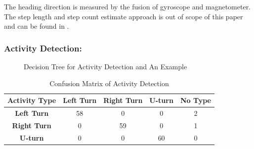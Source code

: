 \documentclass{llncs}
\begin{document}

The heading direction is measured by the fusion of gyroscope and magnetometer. The step length and step count estimate approach is out of scope of this paper and can be found in \cite{wang2012no}. 

\subsubsection{Activity Detection:}

\begin{figure}[!ht]
	\centering
	\vfil
	\caption{Decision Tree for Activity Detection and An Example}
\end{figure}

\begin{table}
	\label{table_conf}
	\caption{Confusion Matrix of Activity Detection}
	\begin{center}
		\begin{tabular}{| c || c | c | c | c |}
			\hline
			\bfseries Activity Type & \bfseries Left Turn & \bfseries Right Turn & \bfseries U-turn & \bfseries No Type\\
			\hline\hline
			\bfseries Left Turn & 58 & 0 & 0 & 2 \\
			\hline
			\bfseries Right Turn & 0 & 59 & 0 & 1 \\
			\hline
			\bfseries U-turn & 0 & 0 & 60 & 0 \\
			\hline
		\end{tabular}
	\end{center}
\end{table}
\end{document}

